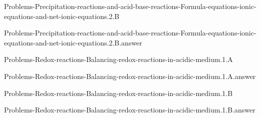 \documentclass[main.tex]{subfiles}
\newcommand\chapterlabel{}
\begin{document}
\renewcommand\chapterlabel{Ch-electrolytes}
\begin{question}[ID=\the\value{numA}]
{Problems-Precipitation-reactions-and-acid-base-reactions-Formula-equations-ionic-equations-and-net-ionic-equations.2.B}
\end{question}
   \begin{Form}
   \TextField[multiline,backgroundcolor=gray!20,borderwidth=0,width=0.43\textwidth  ,height=115pt, name=\the\value{numA}]  { }\end{Form}
\begin{solution}
{Problems-Precipitation-reactions-and-acid-base-reactions-Formula-equations-ionic-equations-and-net-ionic-equations.2.B.answer}
\hspace{0.1cm}
\end{solution}


\renewcommand\chapterlabel{Ch-electrolytes}
\begin{question}[ID=\the\value{numA}]
{Problems-Redox-reactions-Balancing-redox-reactions-in-acidic-medium.1.A}
\end{question}
   \begin{Form}
   \TextField[multiline,backgroundcolor=gray!20,borderwidth=0,width=0.43\textwidth  ,height=115pt, name=\the\value{numA}]  { }\end{Form}
\begin{solution}
{Problems-Redox-reactions-Balancing-redox-reactions-in-acidic-medium.1.A.answer}
\hspace{0.1cm}
\end{solution}


\renewcommand\chapterlabel{Ch-electrolytes}
\begin{question}[ID=\the\value{numA}]
{Problems-Redox-reactions-Balancing-redox-reactions-in-acidic-medium.1.B}
\end{question}
   \begin{Form}
   \TextField[multiline,backgroundcolor=gray!20,borderwidth=0,width=0.43\textwidth  ,height=115pt, name=\the\value{numA}]  { }\end{Form}
\begin{solution}
{Problems-Redox-reactions-Balancing-redox-reactions-in-acidic-medium.1.B.answer}
\hspace{0.1cm}
\end{solution}
\end{document}
